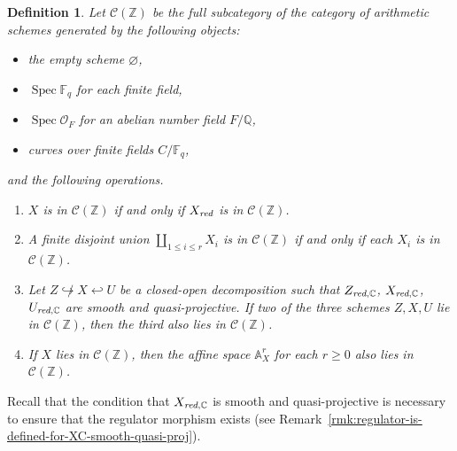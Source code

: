 \documentclass[10pt,a4paper,oneside]{article}
\DeclareMathOperator{\Spec}{Spec}
\newcommand{\CC}{\mathbb{C}}
\newcommand{\FF}{\mathbb{F}}
\newcommand{\QQ}{\mathbb{Q}}
\newcommand{\ZZ}{\mathbb{Z}}
\renewcommand{\AA}{\mathbb{A}}
\renewcommand{\emptyset}{\varnothing}
\newcommand{\red}{\text{\it red}}
\theoremstyle{myplain}
\theoremstyle{mydefinition}
\newtheorem{definition}[theorem]{Definition}
\numberwithin{equation}{section}
\begin{document}
\begin{definition}
  Let $\mathcal{C} (\ZZ)$ be the full subcategory of the category of arithmetic
  schemes generated by the following objects:
  \begin{itemize}
  \item the empty scheme $\emptyset$,
  \item $\Spec \FF_q$ for each finite field,
  \item $\Spec \mathcal{O}_F$ for an abelian number field $F/\QQ$,
  \item curves over finite fields $C/\FF_q$,
  \end{itemize}
  and the following operations.
  \begin{enumerate}
  \item[$\mathcal{C}0)$] $X$ is in $\mathcal{C} (\ZZ)$ if and only if $X_\red$
    is in $\mathcal{C} (\ZZ)$.

  \item[$\mathcal{C}1)$] A finite disjoint union $\coprod_{1 \le i \le r} X_i$
    is in $\mathcal{C} (\ZZ)$ if and only if each $X_i$ is in
    $\mathcal{C} (\ZZ)$.

  \item[$\mathcal{C}2)$] Let $Z \not\hookrightarrow X \hookleftarrow U$ be a
    closed-open decomposition such that $Z_{\red,\CC}$, $X_{\red,\CC}$,
    $U_{\red,\CC}$ are smooth and quasi-projective. If two of the three schemes
    $Z,X,U$ lie in $\mathcal{C} (\ZZ)$, then the third also lies in
    $\mathcal{C} (\ZZ)$.

  \item[$\mathcal{C}3)$] If $X$ lies in $\mathcal{C} (\ZZ)$, then the affine
    space $\AA^r_X$ for each $r \ge 0$ also lies in $\mathcal{C} (\ZZ)$.
  \end{enumerate}
\end{definition}

Recall that the condition that $X_{\red,\CC}$ is smooth and quasi-projective is
necessary to ensure that the regulator morphism exists (see
Remark~\ref{rmk:regulator-is-defined-for-XC-smooth-quasi-proj}).
\end{document}
